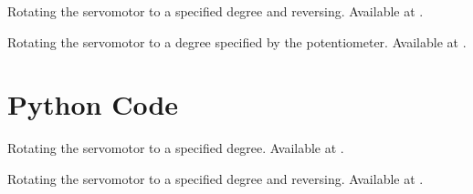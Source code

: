 \begin{scicode}
   {Rotating 
    the servomotor to a specified degree and reversing.  Available at
    .}
  \label{sci:servo-reverse}
  
\end{scicode}

\begin{scicode}
  \label{sci:servo-loop}
  
\end{scicode}

\begin{scicode}
   {Rotating the servomotor to a degree specified by
    the potentiometer.  Available at .}
  \label{sci:servo-pot}
  
\end{scicode}




\section{Python Code}
\lstset{style=mystyle}
\label{sec:servo-python-code}

\begin{pycode}
   {Rotating
    the servomotor to a specified degree.  Available at
    .}
  \label{py:servo-init}
  
\end{pycode}

\begin{pycode}
   {Rotating 
    the servomotor to a specified degree and reversing.  Available at
    .}
  \label{py:servo-reverse}
  
\end{pycode}

\begin{pycode}
  \label{sci:servo-loop}
  
\end{pycode}

